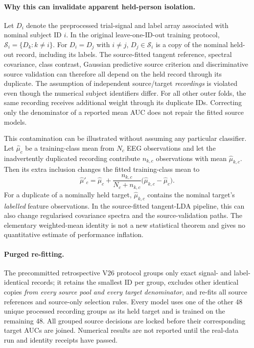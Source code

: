 \paragraph{Why this can invalidate apparent held-person isolation.}
Let $D_i$ denote the preprocessed trial-signal and
label array associated with nominal subject ID $i$.
In the original leave-one-ID-out training protocol,
$\mathcal S_i=\{D_k:k\ne i\}$. For $D_i=D_j$ with
$i\ne j$, $D_j\in\mathcal S_i$ is a copy of the
nominal held-out record, including its labels.
The source-fitted tangent reference, spectral covariance,
class contrast, Gaussian predictive source criterion and
discriminative source validation can therefore all
depend on the held record through its duplicate.
The assumption of independent source/target
\emph{recordings} is violated even though the numerical
subject identifiers differ. For all other outer folds,
the same recording receives additional weight through
its duplicate IDs. Correcting only the denominator
of a reported mean AUC does not repair the fitted
source models.

This contamination can be illustrated without assuming
any particular classifier. Let $\widehat\mu_c$ be a
training-class mean from $N_c$ EEG observations
and let the inadvertently duplicated recording
contribute $n_{k,c}$ observations with mean
$\widehat\mu_{k,c}$. Then its extra inclusion changes
the fitted training-class mean to
\[
 \widehat\mu'_c
 =\widehat\mu_c+
 \frac{n_{k,c}}{N_c+n_{k,c}}
 \bigl(\widehat\mu_{k,c}-\widehat\mu_c\bigr).
\]
For a duplicate of a nominally held target,
$\widehat\mu_{k,c}$ contains the nominal target's
\emph{labelled} feature observations. In the
source-fitted tangent-LDA pipeline, this can also
change regularised covariance spectra and the
source-validation paths. The elementary weighted-mean
identity is not a new statistical theorem and gives
no quantitative estimate of performance inflation.

\paragraph{Purged re-fitting.}
The precommitted retrospective V26 protocol groups
only exact signal- and label-identical records;
it retains the smallest ID per group, excludes
other identical copies \emph{from every source pool
and every target denominator}, and re-fits all
source references and source-only selection rules.
Every model uses one of the other 48 unique
processed recording groups as its held target
and is trained on the remaining 48.
All grouped source decisions are locked before
their corresponding target AUCs are joined.
Numerical results are not reported until the
real-data run and identity receipts have passed.

